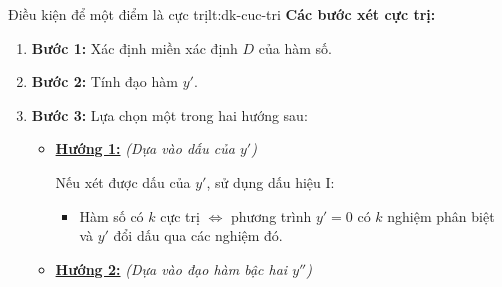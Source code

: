 \begin{lythuyetbox}{Điều kiện để một điểm là cực trị}{lt:dk-cuc-tri}
\vspace{1em}
\textbf{Các bước xét cực trị:}

\begin{enumerate}
    \item \textbf{Bước 1:} Xác định miền xác định $D$ của hàm số.
    \item \textbf{Bước 2:} Tính đạo hàm $y'$.
    \item \textbf{Bước 3:} Lựa chọn một trong hai hướng sau:
    \begin{itemize}
        \item[] \textbf{\underline{Hướng 1:}} \textit{(Dựa vào dấu của $y'$)}
        
        Nếu xét được dấu của $y'$, sử dụng dấu hiệu I:
        \begin{itemize}
            \item Hàm số có $k$ cực trị $\Leftrightarrow$ phương trình $y' = 0$ có $k$ nghiệm phân biệt và $y'$ đổi dấu qua các nghiệm đó.
        \end{itemize}
        
        \vspace{0.5em}
        \item[] \textbf{\underline{Hướng 2:}} \textit{(Dựa vào đạo hàm bậc hai $y''$)}
        

\end{itemize}
\end{enumerate}
\end{lythuyetbox}
